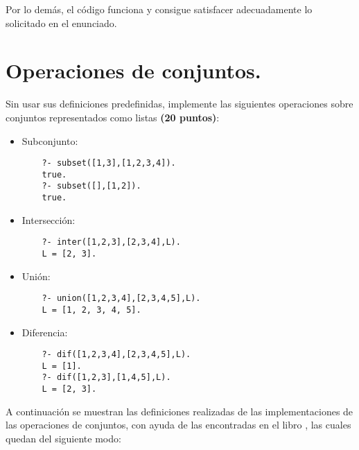 \documentclass[11pt, letterpaper]{article}
\begin{document}
Por lo demás, el código funciona y consigue satisfacer adecuadamente lo solicitado en el enunciado.


\newpage

\section{Operaciones de conjuntos.}

Sin usar sus definiciones predefinidas, implemente las siguientes operaciones sobre conjuntos representados como listas \textbf{(20 puntos)}:


\begin{itemize}
    \item Subconjunto:
    \begin{lstlisting}
    ?- subset([1,3],[1,2,3,4]).
    true.
    ?- subset([],[1,2]).
    true.
    \end{lstlisting}
    \item Intersección:
    \begin{lstlisting}
    ?- inter([1,2,3],[2,3,4],L).
    L = [2, 3].
    \end{lstlisting}
    \item Unión:
    \begin{lstlisting}
    ?- union([1,2,3,4],[2,3,4,5],L).
    L = [1, 2, 3, 4, 5].
    \end{lstlisting}
    \item Diferencia:
    \begin{lstlisting}
    ?- dif([1,2,3,4],[2,3,4,5],L).
    L = [1].
    ?- dif([1,2,3],[1,4,5],L).
    L = [2, 3].
    \end{lstlisting}
\end{itemize}


A continuación se muestran las definiciones realizadas de las implementaciones de las operaciones de conjuntos, con ayuda de las encontradas en el libro \cite{clock2003}, las cuales quedan del siguiente modo:
\end{document}
